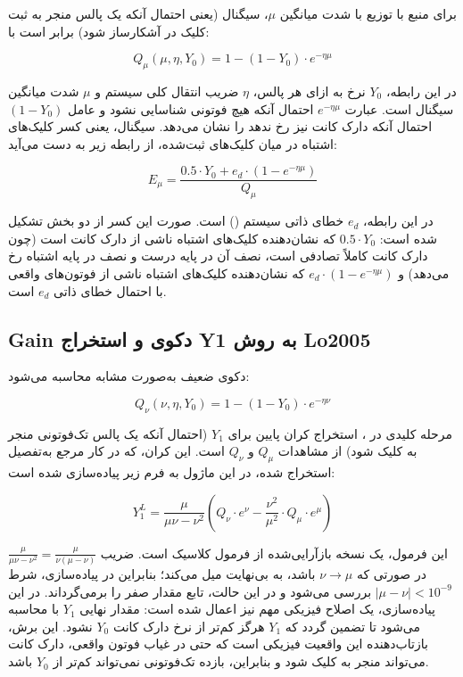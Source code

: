 برای منبع  با توزیع  با شدت میانگین $\mu$،  سیگنال (یعنی احتمال آنکه یک پالس منجر به ثبت کلیک در آشکارساز شود) برابر است با:

\begin{equation}
	Q_\mu(\mu, \eta, Y_0) = 1 - (1 - Y_0) \cdot e^{-\eta \mu}
\end{equation}

در این رابطه، $Y_0$ نرخ  به ازای هر پالس، $\eta$ ضریب انتقال کلی سیستم و $\mu$ شدت میانگین سیگنال است. عبارت $e^{-\eta \mu}$ احتمال آنکه هیچ فوتونی شناسایی نشود و عامل $(1 - Y_0)$ احتمال آنکه دارک کانت نیز رخ ندهد را نشان می‌دهد.  سیگنال، یعنی کسر کلیک‌های اشتباه در میان کلیک‌های ثبت‌شده، از رابطه زیر به دست می‌آید:

\begin{equation}
	E_\mu = \frac{0.5 \cdot Y_0 + e_d \cdot (1 - e^{-\eta \mu})}{Q_\mu}
\end{equation}

در این رابطه، $e_d$ خطای ذاتی سیستم () است. صورت این کسر از دو بخش تشکیل شده است: $0.5 \cdot Y_0$ که نشان‌دهنده کلیک‌های اشتباه ناشی از دارک کانت است (چون دارک کانت کاملاً تصادفی است، نصف آن در پایه درست و نصف در پایه اشتباه رخ می‌دهد) و $e_d \cdot (1 - e^{-\eta \mu})$ که نشان‌دهنده کلیک‌های اشتباه ناشی از فوتون‌های واقعی با احتمال خطای ذاتی $e_d$ است.

\subsection{Gain دکوی و استخراج Y1 به روش Lo2005}

 دکوی ضعیف به‌صورت مشابه محاسبه می‌شود:

\begin{equation}
	Q_\nu(\nu, \eta, Y_0) = 1 - (1 - Y_0) \cdot e^{-\eta \nu}
\end{equation}

مرحله کلیدی در ، استخراج کران پایین برای $Y_1$ (احتمال آنکه یک پالس تک‌فوتونی منجر به کلیک شود) از مشاهدات $Q_\mu$ و $Q_\nu$ است. این کران، که در کار مرجع  به‌تفصیل استخراج شده، در این ماژول به فرم زیر پیاده‌سازی شده است:

\begin{equation}
	Y_1^{L} = \frac{\mu}{\mu \nu - \nu^2} \left( Q_\nu \cdot e^{\nu} - \frac{\nu^2}{\mu^2} \cdot Q_\mu \cdot e^{\mu} \right)
\end{equation}

این فرمول، یک نسخه بازآرایی‌شده از فرمول کلاسیک  است. ضریب $\frac{\mu}{\mu \nu - \nu^2} = \frac{\mu}{\nu(\mu - \nu)}$ در صورتی که $\nu \to \mu$ باشد، به بی‌نهایت میل می‌کند؛ بنابراین در پیاده‌سازی، شرط $\left| \mu - \nu \right| < 10^{-9}$ بررسی می‌شود و در این حالت، تابع مقدار صفر را برمی‌گرداند. در این پیاده‌سازی، یک اصلاح فیزیکی مهم نیز اعمال شده است: مقدار نهایی $Y_1$ با  محاسبه می‌شود تا تضمین گردد که $Y_1$ هرگز کم‌تر از نرخ دارک کانت $Y_0$ نشود. این برش، بازتاب‌دهنده این واقعیت فیزیکی است که حتی در غیاب فوتون واقعی، دارک کانت می‌تواند منجر به کلیک شود و بنابراین، بازده تک‌فوتونی نمی‌تواند کم‌تر از $Y_0$ باشد.

